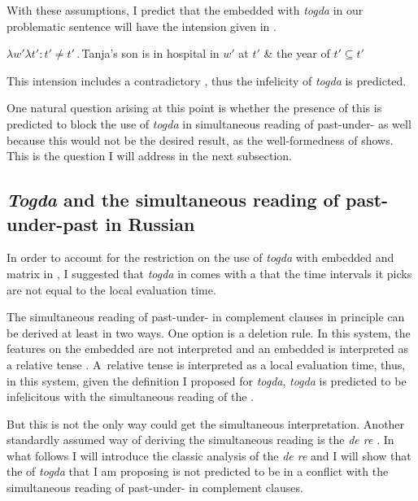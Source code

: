 \documentclass[output=paper,modfonts,newtxmath,hidelinks]{langscibook}
\begin{document}
\label{20:ex32}
\z

\noindent With these assumptions, I predict that the embedded  with \textit{togda} in our problematic sentence  will have the intension given in .

\ea $\lambda w'\lambda t':t'\neq t'\,.\,{}$Tanja's son is in hospital in $w'$ at $t'$ \& the year of $t'\subseteq t'$\label{20:ex33}
\z

\noindent This intension includes a contradictory , thus the infelicity of \textit{togda} is predicted.

One natural question arising at this point is whether the presence of this  is predicted to block the use of \textit{togda} in simultaneous reading of past-under- as well because this would not be the desired result, as the well-formedness of  shows. This is the question I will address in the next subsection.

\subsection{\textit{Togda} and the simultaneous reading of past-under-past in Russian}\label{20:s2.4}

\noindent In order to account for the restriction on the use of \textit{togda} with embedded and matrix  in , I suggested that \textit{togda} in  comes with a  that the time intervals it picks are not equal to the local evaluation time.

The simultaneous reading of past-under- in complement clauses in principle can be derived at least in two ways. One option is a  deletion rule. In this system, the  features on the embedded  are not interpreted and an embedded  is interpreted as a relative tense \citep{Ogihara1989,Ogihara1995}. A~relative tense is interpreted as a local evaluation time, thus, in this system, given the definition I proposed for \textit{togda}, \textit{togda} is predicted to be infelicitous with the simultaneous reading of the .

But this is not the only way  could get the simultaneous interpretation. Another standardly assumed way of deriving the simultaneous reading is the \textit{de re}  \citep{Abusch1997,Heim1994,OgiharaSharvit2012}. In what follows I will introduce the classic analysis of the \textit{de re}  and I will show that the  of \textit{togda} that I am proposing is not predicted to be in a conflict with the simultaneous reading of past-under- in complement clauses.
\end{document}
